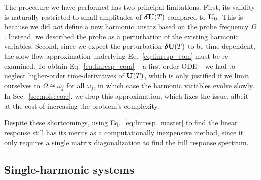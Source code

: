 The procedure we have performed has two principal limitations. First, its validity is naturally restricted to small amplitudes of $\boldsymbol{\delta} \vb{U}(T)$ compared to $\vb{U}_0$. This is because we did \textit{not} define a new harmonic ansatz based on the probe frequency $\Omega$. Instead, we described the probe as a perturbation of the existing harmonic variables. Second, since we expect the perturbation $\boldsymbol{\delta} \vb{U}(T)$ to be time-dependent, the slow-flow approximation underlying Eq.~\eqref{eq:linresp_eom} must be re-examined. To obtain Eq.~\eqref{eq:linresp_eom} -- a first-order ODE -- we had to neglect higher-order time-derivatives of $\vb{U}(T)$, which is only justified if we limit ourselves to $\Omega \cong \omega_j$ for all $\omega_j$, in which case the harmonic variables evolve slowly. In Sec.~\ref{sec:noisecorr}, we drop this approximation, which fixes the issue, albeit at the cost of increasing the problem's complexity.

Despite these shortcomings, using Eq.~\eqref{eq:linresp_master} to find the linear response still has its merits as a computationally inexpensive method, since it only requires a single matrix diagonalization to find the full response spectrum. 

\subsection{Single-harmonic systems} \label{sec:single_harmonic}

